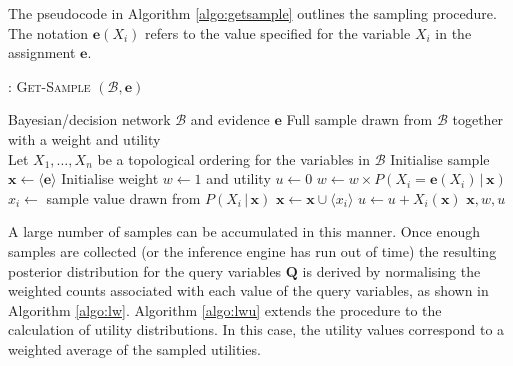 The pseudocode in Algorithm \ref{algo:getsample} outlines the sampling procedure.  The notation $\mathbf{e}(X_i)$ refers to the value specified for the variable $X_i$ in the assignment $\mathbf{e}$. 


\begin{algorithm}[h!]
\caption{: \textsc{Get-Sample} $(\mathcal{B}, \mathbf{e})$}
\begin{algorithmic}[1] \vspace{2mm} 
\REQUIRE Bayesian/decision network $\mathcal{B}$  and evidence $\mathbf{e}$
\ENSURE Full sample drawn from $\mathcal{B}$ together with a weight and utility \\[2mm]
\STATE Let $X_1,\dots, X_n$ be a topological ordering for the variables in $\mathcal{B}$
\STATE Initialise sample $\mathbf{x} \leftarrow \langle \mathbf{e} \rangle$
\STATE Initialise weight $w \leftarrow 1$ and utility $u \leftarrow 0$
\STATE $w \leftarrow w \times P\left(X_i = \mathbf{e}(X_i)  \, | \,  \mathbf{x}\right)$
\STATE $x_i \leftarrow$ sample value drawn from $P(X_i  \, | \,  \mathbf{x})$
\STATE $\mathbf{x} \leftarrow \mathbf{x} \cup \langle x_i \rangle$
\STATE $u \leftarrow u + X_i(\mathbf{x})$
\ENDIF
\ENDFOR
\RETURN $\mathbf{x}, w, u$
\end{algorithmic}
\label{algo:getsample}
\end{algorithm}

A large number of samples can be accumulated in this manner. Once enough samples are collected (or the inference engine has run out of time) the resulting posterior distribution for the query variables $\mathbf{Q}$ is derived by normalising the weighted counts associated with each value of the query variables, as shown in Algorithm \ref{algo:lw}. Algorithm \ref{algo:lwu} extends the procedure to the calculation of utility distributions. In this case, the utility values correspond to a weighted average of the sampled utilities. 

